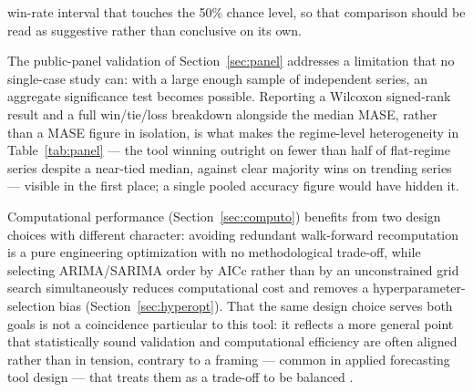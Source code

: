 \documentclass[forecasting,article,submit,pdftex,moreauthors]{Definitions/mdpi}
\begin{document}
win-rate interval that touches the 50\% chance level, so that comparison should be read as suggestive rather than conclusive on its own.

The public-panel validation of Section~\ref{sec:panel} addresses a limitation that no single-case study can: with a large enough sample of independent series, an aggregate significance test becomes possible. Reporting a Wilcoxon signed-rank result and a full win/tie/loss breakdown alongside the median MASE, rather than a MASE figure in isolation, is what makes the regime-level heterogeneity in Table~\ref{tab:panel} --- the tool winning outright on fewer than half of flat-regime series despite a near-tied median, against clear majority wins on trending series --- visible in the first place; a single pooled accuracy figure would have hidden it.

Computational performance (Section~\ref{sec:computo}) benefits from two design choices with different character: avoiding redundant walk-forward recomputation is a pure engineering optimization with no methodological trade-off, while selecting ARIMA/SARIMA order by AICc rather than by an unconstrained grid search simultaneously reduces computational cost and removes a hyperparameter-selection bias (Section~\ref{sec:hyperopt}). That the same design choice serves both goals is not a coincidence particular to this tool: it reflects a more general point that statistically sound validation and computational efficiency are often aligned rather than in tension, contrary to a framing --- common in applied forecasting tool design --- that treats them as a trade-off to be balanced \cite{petropoulos2022}.
\end{document}
